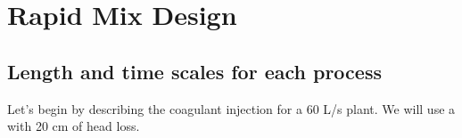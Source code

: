 \documentclass[letterpaper,10pt,english]{sphinxmanual}
\begin{document}
\chapter{Rapid Mix Design}
\label{\detokenize{Rapid_Mix/RM_Design:rapid-mix-design}}\label{\detokenize{Rapid_Mix/RM_Design:title-rapid-mix-design}}\label{\detokenize{Rapid_Mix/RM_Design::doc}}

\section{Length and time scales for each process}
\label{\detokenize{Rapid_Mix/RM_Design:length-and-time-scales-for-each-process}}\label{\detokenize{Rapid_Mix/RM_Design:heading-length-and-time-scales-for-each-process}}
Let’s begin by describing the coagulant injection for a 60 L/s plant. We will use a {\hyperref[\detokenize{Flow_Control_and_Measurement/FCM_Design:heading-lfom}]{}}
with 20 cm of head loss.
\end{document}
